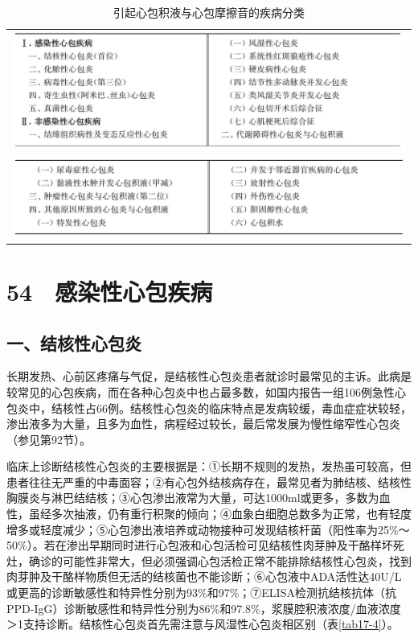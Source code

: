 \begin{longtable}{c}
 \caption{引起心包积液与心包摩擦音的疾病分类}
 \label{tab17-3}
 \endfirsthead
 \caption[]{引起心包积液与心包摩擦音的疾病分类}
 \endhead
 \includegraphics[width=\textwidth,height=\textheight,keepaspectratio]{./images/Image00107.jpg}\\
 \includegraphics[width=\textwidth,height=\textheight,keepaspectratio]{./images/Image00108.jpg}
 \end{longtable}

\protect\hypertarget{text00145.html}{}{}

\section{54　感染性心包疾病}

\subsection{一、结核性心包炎}

长期发热、心前区疼痛与气促，是结核性心包炎患者就诊时最常见的主诉。此病是较常见的心包疾病，而在各种心包炎中也占最多数，如国内报告一组106例急性心包炎中，结核性占66例。结核性心包炎的临床特点是发病较缓，毒血症症状较轻，渗出液多为大量，且多为血性，病程经过较长，最后常发展为慢性缩窄性心包炎（参见第92节）。

临床上诊断结核性心包炎的主要根据是：①长期不规则的发热，发热虽可较高，但患者往往无严重的中毒面容；②有心包外结核病存在，最常见者为肺结核、结核性胸膜炎与淋巴结结核；③心包渗出液常为大量，可达1000ml或更多，多数为血性，虽经多次抽液，仍有重行积聚的倾向；④血象白细胞总数多为正常，也有轻度增多或轻度减少；⑤心包渗出液培养或动物接种可发现结核杆菌（阳性率为25\%～50\%）。若在渗出早期同时进行心包液和心包活检可见结核性肉芽肿及干酪样坏死灶，确诊的可能性非常大，但必须强调心包活检正常不能排除结核性心包炎，找到肉芽肿及干酪样物质但无活的结核菌也不能诊断；⑥心包液中ADA活性达40U/L或更高的诊断敏感性和特异性分别为93\%和97\%；⑦ELISA检测抗结核抗体（抗PPD-IgG）诊断敏感性和特异性分别为86\%和97.8\%，浆膜腔积液浓度/血液浓度＞1支持诊断。结核性心包炎首先需注意与风湿性心包炎相区别（表\ref{tab17-4}）。


